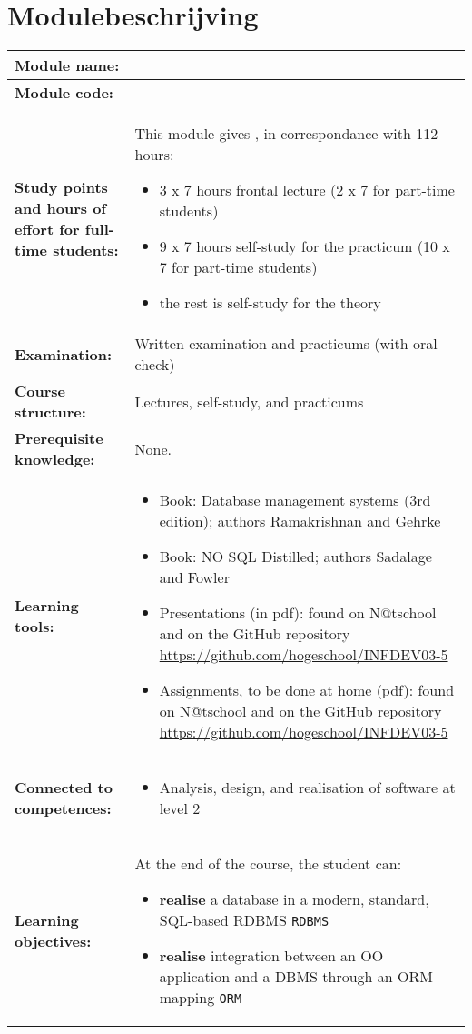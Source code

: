 \section*{Modulebeschrijving}
\begin{tabularx}{\textwidth}{|>{\columncolor{lichtGrijs}} p{}|X|}
	\hline
	\textbf{Module name:} & \modulenaam\\
	\hline
	\textbf{Module code: }& \modulecode\\
	\hline
	\textbf{Study points \newline and hours of effort for full-time students:} & This module gives \stdPunten, in correspondance with 112 hours:
	\begin{itemize}
		\item 3 x 7 hours frontal lecture (2 x 7 for part-time students)
		\item 9 x 7 hours self-study for the practicum (10 x 7 for part-time students)
		\item the rest is self-study for the theory
	\end{itemize} \\
	\hline
	\textbf{Examination:} & Written examination and practicums (with oral check) \\
	\hline
	\textbf{Course structure:} & Lectures, self-study, and practicums \\
	\hline
	\textbf{Prerequisite knowledge:} & None. \\
	\hline
	\textbf{Learning tools:}  &
		\begin{itemize}
			\item Book: Database management systems (3rd edition); authors Ramakrishnan and Gehrke
			\item Book: NO SQL Distilled; authors Sadalage and Fowler
			\item Presentations (in pdf): found on N@tschool and on the GitHub repository \url{https://github.com/hogeschool/INFDEV03-5}
			\item Assignments, to be done at home (pdf): found on N@tschool and on the GitHub repository \url{https://github.com/hogeschool/INFDEV03-5}
		\end{itemize} \\
	\hline
	\textbf{Connected to \newline competences:} &
		\begin{itemize}
			\item Analysis, design, and realisation of software at level 2
		\end{itemize} \\
	\hline
	\textbf{Learning objectives:} &
		At the end of the course, the student can:
			\begin{itemize}
				\item \textbf{realise} a database in a modern, standard, SQL-based RDBMS \texttt{RDBMS}
				\item \textbf{realise} integration between an OO application and a DBMS through an ORM mapping \texttt{ORM}


\end{itemize}
\end{tabularx}
